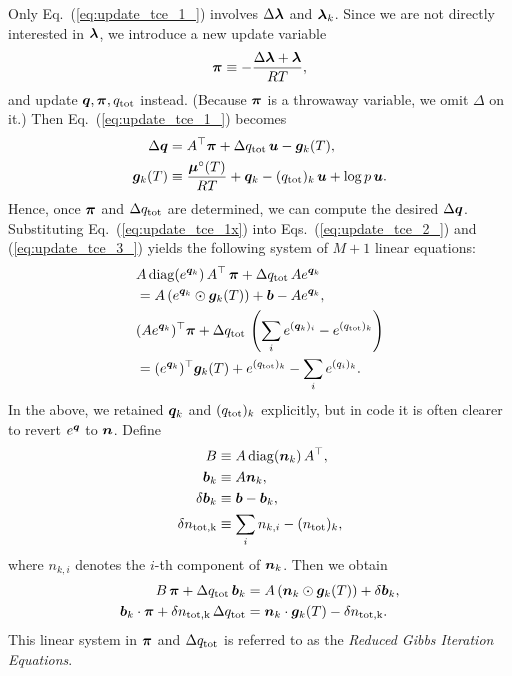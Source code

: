 Only Eq.~(\ref{eq:update_tce_1_}) involves $\Delta \boldsymbol{\lambda}$ and $\boldsymbol{\lambda}_k$. Since we are not directly interested in $\boldsymbol{\lambda}$, we introduce a new update variable
\begin{align}
    \boldsymbol{\pi} \equiv - \frac{\Delta \boldsymbol{\lambda} + \boldsymbol{\lambda}}{RT},
\end{align}
and update $\boldsymbol{q}, \boldsymbol{\pi}, q_\mathrm{tot}$ instead. (Because $\boldsymbol{\pi}$ is a throwaway variable, we omit $\Delta$ on it.) Then Eq.~(\ref{eq:update_tce_1_}) becomes
\begin{align}
\label{eq:update_tce_1x}
    \Delta \boldsymbol{q} &=  A^\top \boldsymbol{\pi} + \Delta q_\mathrm{tot} \, \boldsymbol{u} - \boldsymbol{g}_k(T), \\
    \boldsymbol{g}_k (T) &\equiv \frac{\boldsymbol{\mu}^\circ(T)}{RT} + {\boldsymbol{q}}_k - (q_\mathrm{tot})_k \, \boldsymbol{u} + \log{p} \, \boldsymbol{u} .
\end{align}
Hence, once $\boldsymbol{\pi}$ and $\Delta q_\mathrm{tot}$ are determined, we can compute the desired $\Delta \boldsymbol{q}$. Substituting Eq.~(\ref{eq:update_tce_1x}) into Eqs.~(\ref{eq:update_tce_2_}) and (\ref{eq:update_tce_3_}) yields the following system of $M+1$ linear equations:
\begin{align}
    &A \, \mathrm{diag} (e^{\boldsymbol{q}_k}) \, A^\top \, \boldsymbol{\pi} + \Delta q_\mathrm{tot} \, A e^{\boldsymbol{q}_k} \nonumber \\
    &= A \left(e^{\boldsymbol{q}_k} \odot \boldsymbol{g}_k (T) \right) + \boldsymbol{b} - A  e^{\boldsymbol{q}_k}, \\
    &(A  e^{\boldsymbol{q}_k})^\top \boldsymbol{\pi} + \Delta q_\mathrm{tot} \, \left( \sum_i e^{(\boldsymbol{q}_k)_i} - e^{(q_\mathrm{tot})_k} \right) \nonumber \\ 
    &= (e^{\boldsymbol{q}_k})^\top \boldsymbol{g}_k(T) + e^{(q_\mathrm{tot})_k} - \sum_i {e^{(q_i)_k}} .
\end{align}
In the above, we retained $\boldsymbol{q}_k$ and $(q_\mathrm{tot})_k$ explicitly, but in code it is often clearer to revert $e^{\boldsymbol{q}}$ to $\boldsymbol{n}$. Define
\begin{align}
    B &\equiv  A \, \mathrm{diag} (\boldsymbol{n}_k) \, A^\top, \\
    \boldsymbol{b}_k &\equiv A \boldsymbol{n}_k, \\
    \delta \boldsymbol{b}_k &\equiv \boldsymbol{b} - \boldsymbol{b}_k, \\
     \delta n_\mathrm{tot,k} &\equiv  \sum_i n_{k,i} - (n_\mathrm{tot})_{k},
\end{align}
where $n_{k,i}$ denotes the $i$-th component of $\boldsymbol{n}_k$. Then we obtain
\begin{align}
\label{eq:rgie1}
   B \, \boldsymbol{\pi} + \Delta q_\mathrm{tot} \, \boldsymbol{b}_k &= A \left( \boldsymbol{n}_k \odot \boldsymbol{g}_k (T) \right) + \delta \boldsymbol{b}_k, \\
\label{eq:rgie2}
\boldsymbol{b}_k \cdot \boldsymbol{\pi} + \delta n_\mathrm{tot, k} \, \Delta q_\mathrm{tot} &= \boldsymbol{n}_k \cdot \boldsymbol{g}_k(T) - \delta n_\mathrm{tot,k}.
\end{align}
This linear system in $\boldsymbol{\pi}$ and $\Delta q_\mathrm{tot}$ is referred to as the \emph{Reduced Gibbs Iteration Equations}.
